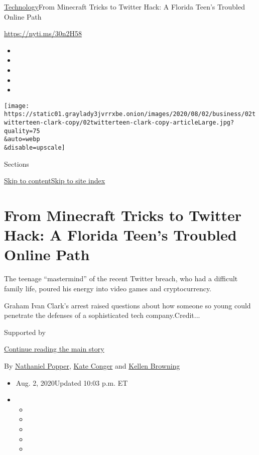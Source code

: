 \href{/section/technology}{Technology}\textbar{}From Minecraft Tricks to
Twitter Hack: A Florida Teen's Troubled Online Path

\url{https://nyti.ms/30n2H58}

\begin{itemize}
\item
\item
\item
\item
\item
\end{itemize}

\texttt{[image: https://static01.graylady3jvrrxbe.onion/images/2020/08/02/business/02twitterteen-clark-copy/02twitterteen-clark-copy-articleLarge.jpg?quality=75\\\&auto=webp\\\&disable=upscale]}

Sections

\protect\hyperlink{site-content}{Skip to
content}\protect\hyperlink{site-index}{Skip to site index}

\hypertarget{from-minecraft-tricks-to-twitter-hack-a-florida-teens-troubled-online-path}{%
\section{From Minecraft Tricks to Twitter Hack: A Florida Teen's
Troubled Online
Path}\label{from-minecraft-tricks-to-twitter-hack-a-florida-teens-troubled-online-path}}

The teenage ``mastermind'' of the recent Twitter breach, who had a
difficult family life, poured his energy into video games and
cryptocurrency.

Graham Ivan Clark's arrest raised questions about how someone so young
could penetrate the defenses of a sophisticated tech company.Credit...

Supported by

\protect\hyperlink{after-sponsor}{Continue reading the main story}

By
\href{https://www.nytimes3xbfgragh.onion/by/nathaniel-popper}{Nathaniel
Popper}, \href{https://www.nytimes3xbfgragh.onion/by/kate-conger}{Kate
Conger} and
\href{https://www.nytimes3xbfgragh.onion/by/kellen-browning}{Kellen
Browning}

\begin{itemize}
\item
  Aug. 2, 2020Updated 10:03 p.m. ET
\item
  \begin{itemize}
  \item
  \item
  \item
  \item
  \item
  \end{itemize}
\end{itemize}

